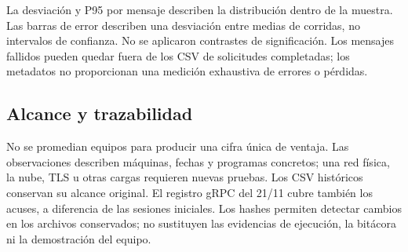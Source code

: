 La desviación y P95 por mensaje describen la distribución dentro de
la muestra. Las barras de error describen una desviación entre medias
de corridas, no intervalos de confianza. No se aplicaron contrastes
de significación. Los mensajes fallidos pueden quedar fuera de los
CSV de solicitudes completadas; los metadatos no proporcionan una
medición exhaustiva de errores o pérdidas.

\subsection{Alcance y trazabilidad}
No se promedian equipos para producir una cifra única de ventaja.
Las observaciones describen máquinas, fechas y programas concretos;
una red física, la nube, TLS u otras cargas requieren nuevas pruebas.
Los CSV históricos conservan su alcance original. El registro gRPC
del 21/11 cubre también los acuses, a diferencia de las sesiones
iniciales. Los hashes permiten detectar cambios en los archivos
conservados; no sustituyen las evidencias de ejecución, la bitácora
ni la demostración del equipo.
